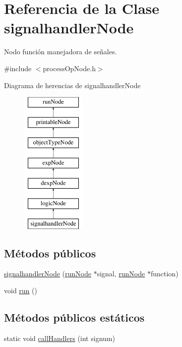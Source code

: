 \hypertarget{classsignalhandlerNode}{\section{Referencia de la Clase signalhandler\-Node}
\label{classsignalhandlerNode}
}


Nodo función manejadora de señales.  




{\ttfamily \#include $<$process\-Op\-Node.\-h$>$}

Diagrama de herencias de signalhandler\-Node\begin{figure}[H]
\begin{center}
\leavevmode
\includegraphics[height=7.000000cm]{classsignalhandlerNode}
\end{center}
\end{figure}
\subsection*{Métodos públicos}
\begin{DoxyCompactItemize}
\item 
\hyperlink{classsignalhandlerNode_a92ee4a27b05f6058e67a717dec164de0}{signalhandler\-Node} (\hyperlink{classrunNode}{run\-Node} $\ast$signal, \hyperlink{classrunNode}{run\-Node} $\ast$function)
\item 
void \hyperlink{classsignalhandlerNode_a53ba7498168b7ad02d6b34e2557e5e46}{run} ()
\end{DoxyCompactItemize}
\subsection*{Métodos públicos estáticos}
\begin{DoxyCompactItemize}
\item 
static void \hyperlink{classsignalhandlerNode_a4d58e7c1624d297a71df653b7ac8d9ec}{call\-Handlers} (int signum)
\end{DoxyCompactItemize}
